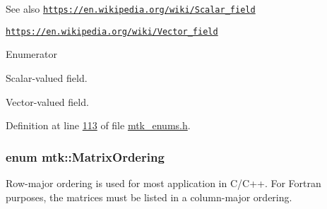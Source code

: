 \begin{DoxySeeAlso}{See also}
\href{https://en.wikipedia.org/wiki/Scalar_field}{\tt https\+://en.\+wikipedia.\+org/wiki/\+Scalar\+\_\+field}

\href{https://en.wikipedia.org/wiki/Vector_field}{\tt https\+://en.\+wikipedia.\+org/wiki/\+Vector\+\_\+field} 
\end{DoxySeeAlso}
\begin{Desc}
\item[Enumerator]\par
\begin{description}
\item[{\em 
\hypertarget{group__c02-enums_ga4c54f2a329cfb4e56213b02a259d19e2af481d45bd70d41381c7d72e200889205}{S\+C\+A\+L\+A\+R}\label{group__c02-enums_ga4c54f2a329cfb4e56213b02a259d19e2af481d45bd70d41381c7d72e200889205}
}]Scalar-\/valued field. \item[{\em 
\hypertarget{group__c02-enums_ga4c54f2a329cfb4e56213b02a259d19e2a3d8cb27a993651a74d67fb8c98ae91b2}{V\+E\+C\+T\+O\+R}\label{group__c02-enums_ga4c54f2a329cfb4e56213b02a259d19e2a3d8cb27a993651a74d67fb8c98ae91b2}
}]Vector-\/valued field. \end{description}
\end{Desc}


Definition at line \hyperlink{mtk__enums_8h_source_l00113}{113} of file \hyperlink{mtk__enums_8h_source}{mtk\+\_\+enums.\+h}.

\hypertarget{group__c02-enums_ga622801bd9f912d0f976c3e383f5f581c}{
\subsubsection[{Matrix\+Ordering}]{\setlength{\rightskip}{0pt plus 5cm}enum {\bf mtk\+::\+Matrix\+Ordering}}}\label{group__c02-enums_ga622801bd9f912d0f976c3e383f5f581c}
Row-\/major ordering is used for most application in C/\+C++. For Fortran purposes, the matrices must be listed in a column-\/major ordering.

